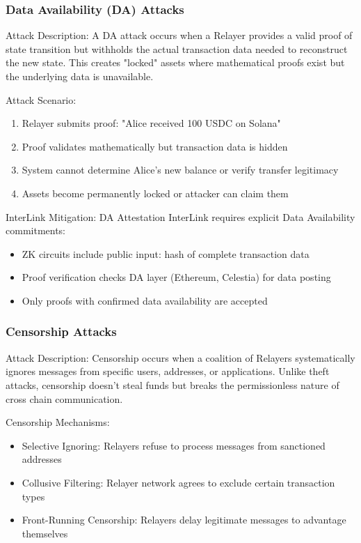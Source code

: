 \documentclass[11pt,a4paper]{article}
\begin{document}
\subsubsection{Data Availability (DA) Attacks}

Attack Description:
A DA attack occurs when a Relayer provides a valid proof of state transition but withholds the actual transaction data needed to reconstruct the new state. This creates "locked" assets where mathematical proofs exist but the underlying data is unavailable.

Attack Scenario:
\begin{enumerate}
    \item Relayer submits proof: "Alice received 100 USDC on Solana"
    \item Proof validates mathematically but transaction data is hidden
    \item System cannot determine Alice's new balance or verify transfer legitimacy
    \item Assets become permanently locked or attacker can claim them
\end{enumerate}

InterLink Mitigation: DA Attestation
InterLink requires explicit Data Availability commitments:
\begin{itemize}
    \item ZK circuits include public input: hash of complete transaction data
    \item Proof verification checks DA layer (Ethereum, Celestia) for data posting
    \item Only proofs with confirmed data availability are accepted
\end{itemize}

\subsubsection{Censorship Attacks}

Attack Description:
Censorship occurs when a coalition of Relayers systematically ignores messages from specific users, addresses, or applications. Unlike theft attacks, censorship doesn't steal funds but breaks the permissionless nature of cross chain communication.

Censorship Mechanisms:
\begin{itemize}
    \item Selective Ignoring: Relayers refuse to process messages from sanctioned addresses
    \item Collusive Filtering: Relayer network agrees to exclude certain transaction types
    \item Front-Running Censorship: Relayers delay legitimate messages to advantage themselves
\end{itemize}
\end{document}
